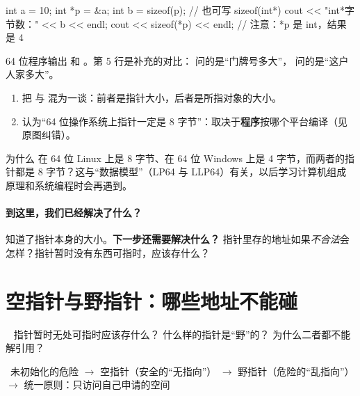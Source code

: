 \begin{examplebox}[3.1\quad 笔记 §7.3 示例]
\begin{code}
int a = 10;
int *p = &a;
int b = sizeof(p);             // 也可写 sizeof(int*)
cout << "int*字节数：" << b << endl;
cout << sizeof(*p) << endl;    // 注意：*p 是 int，结果是 4
\end{code}
64 位程序输出  和 。第 5 行是补充的对比： 问的是“门牌号多大”， 问的是“这户人家多大”。
\end{examplebox}

\begin{warningbox}
\begin{enumerate}
  \item 把  与  混为一谈：前者是指针大小，后者是所指对象的大小。
  \item 认为“64 位操作系统上指针一定是 8 字节”：取决于\textbf{程序}按哪个平台编译（见原图纠错）。
\end{enumerate}
\end{warningbox}

\begin{extendbox}
为什么  在 64 位 Linux 上是 8 字节、在 64 位 Windows 上是 4 字节，而两者的指针都是 8 字节？这与“数据模型”（LP64 与 LLP64）有关，以后学习计算机组成原理和系统编程时会再遇到。
\end{extendbox}

\paragraph{到这里，我们已经解决了什么？} 知道了指针本身的大小。\textbf{下一步还需要解决什么？} 指针里存的地址如果\emph{不合法}会怎样？指针暂时没有东西可指时，应该存什么？

\section{空指针与野指针：哪些地址不能碰}\label{sec:null}
\  指针暂时无处可指时应该存什么？ 什么样的指针是“野”的？ 为什么二者都不能解引用？\par
{}\ 未初始化的危险 $\to$ 空指针（安全的“无指向”） $\to$ 野指针（危险的“乱指向”） $\to$ 统一原则：只访问自己申请的空间

